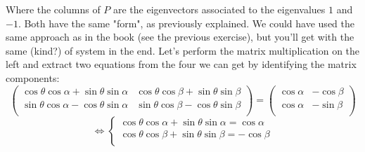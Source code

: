 \documentclass[solutions.tex]{subfiles}
\begin{document}
Where the columns of $P$ are the eigenvectors associated
to the eigenvalues $1$ and $-1$. Both have the same "form", as
previously explained. We could have used the same approach as in
the book (see the previous exercise), but you'll get with the
same (kind?) of system in the end. Let's perform the
matrix multiplication on the left and extract two equations from the
four we can get by identifying the matrix components:
\[
	\begin{pmatrix}
		\cos\theta\cos\alpha + \sin\theta\sin\alpha &
			\cos\theta\cos\beta + \sin\theta\sin\beta \\
		\sin\theta\cos\alpha - \cos\theta\sin\alpha &
			\sin\theta\cos\beta - \cos\theta\sin\beta \\
	\end{pmatrix} = \begin{pmatrix}
		\cos\alpha & -\cos\beta \\
		\cos\alpha & -\sin\beta \\
	\end{pmatrix}
\]
\[
	\Leftrightarrow\begin{cases}
		\cos\theta\cos\alpha + \sin\theta\sin\alpha = \cos\alpha \\
		\cos\theta\cos\beta  + \sin\theta\sin\beta  = -\cos\beta \\
	\end{cases}
\]
\end{document}
